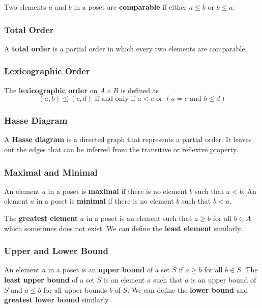 \documentclass[a4paper,12pt]{article}
\begin{document}
Two elements $a$ and $b$ in a poset are \textbf{comparable} if either $a \leq b$ or $b \leq a$.

\subsubsection{Total Order}

A \textbf{total order} is a partial order in which every two elements are comparable.

\subsubsection{Lexicographic Order}

The \textbf{lexicographic order} on $A \times B$ is defined as
\begin{equation*}
	(a,b) \leq (c,d) \text{ if and only if } a < c \text{ or } (a = c \text{ and } b \leq d)
\end{equation*}

\subsubsection{Hasse Diagram}

A \textbf{Hasse diagram} is a directed graph that represents a partial order.
It leaves out the edges that can be inferred from the transitive or reflexive property.

\subsubsection{Maximal and Minimal}

An element $a$ in a poset is \textbf{maximal} if there is no element $b$ such that $a < b$.
An element $a$ in a poset is \textbf{minimal} if there is no element $b$ such that $b < a$.

The \textbf{greatest element} $a$ in a poset is an element such that $a \geq b$ for all $b \in A$, which sometimes does not exist.
We can define the \textbf{least element} similarly.

\subsubsection{Upper and Lower Bound}

An element $a$ in a poset is an \textbf{upper bound} of a set $S$ if $a \geq b$ for all $b \in S$.
The \textbf{least upper bound} of a set $S$ is an element $a$ such that $a$ is an upper bound of $S$ and $a \leq b$ for all upper bounds $b$ of $S$.
We can define the \textbf{lower bound} and \textbf{greatest lower bound} similarly.
\end{document}
